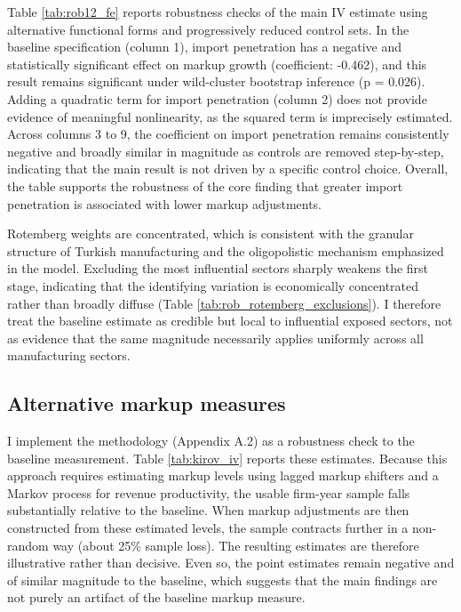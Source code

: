 \documentclass[12pt]{article}
\begin{document}
Table \ref{tab:rob12_fe} reports robustness checks of the main IV estimate using alternative functional forms and progressively reduced control sets. In the baseline specification (column 1), import penetration has a negative and statistically significant effect on markup growth (coefficient: -0.462), and this result remains significant under wild-cluster bootstrap inference (p = 0.026). Adding a quadratic term for import penetration (column 2) does not provide evidence of meaningful nonlinearity, as the squared term is imprecisely estimated. Across columns 3 to 9, the coefficient on import penetration remains consistently negative and broadly similar in magnitude as controls are removed step-by-step, indicating that the main result is not driven by a specific control choice. Overall, the table supports the robustness of the core finding that greater import penetration is associated with lower markup adjustments.

Rotemberg weights are concentrated, which is consistent with the granular structure of Turkish manufacturing and the oligopolistic mechanism emphasized in the model. Excluding the most influential sectors sharply weakens the first stage, indicating that the identifying variation is economically concentrated rather than broadly diffuse (Table \ref{tab:rob_rotemberg_exclusions}). I therefore treat the baseline estimate as credible but local to influential exposed sectors, not as evidence that the same magnitude necessarily applies uniformly across all manufacturing sectors.


\subsection{Alternative markup measures}
I implement the \textcite{kirovMeasuringMarkupsRevenue2026} methodology (Appendix A.2) as a robustness check to the baseline measurement. Table \ref{tab:kirov_iv} reports these estimates. Because this approach requires estimating markup levels using lagged markup shifters and a Markov process for revenue productivity, the usable firm-year sample falls substantially relative to the baseline. When markup adjustments are then constructed from these estimated levels, the sample contracts further in a non-random way (about 25\% sample loss). The resulting estimates are therefore illustrative rather than decisive. Even so, the point estimates remain negative and of similar magnitude to the baseline, which suggests that the main findings are not purely an artifact of the baseline markup measure.
\end{document}
